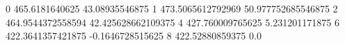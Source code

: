 0 465.6181640625 43.08935546875
1 473.5065612792969 50.977752685546875
2 464.9544372558594 42.425628662109375
4 427.760009765625 5.231201171875
6 422.3641357421875 -0.1646728515625
8 422.52880859375 0.0
